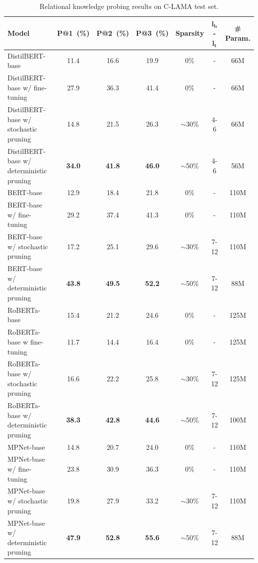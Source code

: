 \begin{table}[t!]
	\centering
	\scriptsize
	\begin{tabular}{l|ccc|c|c|c}
		\toprule
		\textbf{Model} & \textbf{P@1~(\%)} & \textbf{P@2~(\%)} & \textbf{P@3~(\%)} & \textbf{Sparsity}  & $\bm{l_b}$-$\bm{l_t}$ & \textbf{\# Param.}\\
		\midrule
		DistilBERT-base & 11.4 &16.6  &19.9  & 0\% & - & 66M\\
		DistilBERT-base w/ fine-tuning &27.9  &36.3  &41.4  & 0\% & - & 66M\\
		DistilBERT-base w/ stochastic pruning & 14.8 &21.5 &26.3 & $\sim$30\% & 4-6 &66M \\
		DistilBERT-base w/ deterministic pruning & \textbf{34.0} &\textbf{41.8} &\textbf{46.0} & $\sim$50\% & 4-6 &56M \\
		\midrule
		BERT-base & 12.9 & 18.4  & 21.8 & 0\% & -  &110M\\
		BERT-base w/ fine-tuning &29.2  &37.4   &41.3  & 0\% & -  &110M\\
		BERT-base w/ stochastic pruning & 17.2 & 25.1  & 29.6  & $\sim$30\% & 7-12 & 110M\\
		BERT-base w/ deterministic pruning & \textbf{43.8} & \textbf{49.5}  & \textbf{52.2}  & $\sim$50\% & 7-12 & 88M\\
		\midrule
		RoBERTa-base & 15.4 & 21.2  & 24.6 & 0\% & - &125M  \\
		RoBERTa-base w fine-tuning &11.7  &14.4  &16.4 & 0\% & - &125M  \\
		RoBERTa-base w/ stochastic pruning &16.6  &22.2   &25.8   & $\sim$30\% & 7-12 & 125M\\
		RoBERTa-base w/ deterministic pruning &\textbf{38.3}  &\textbf{42.8}   &\textbf{44.6}   & $\sim$50\% & 7-12 &100M \\
		\midrule
		MPNet-base& 14.8  &20.7   &24.0 & 0\%  & - & 110M\\
		MPNet-base w/ fine-tuning &23.8   &30.9   &36.3 & 0\%  & - & 110M\\
		MPNet-base w/ stochastic pruning &19.8  &27.9   &33.2  & $\sim$30\% & 7-12  & 110M\\
		MPNet-base w/ deterministic pruning & \textbf{47.9} &\textbf{52.8}   &\textbf{55.6}  & $\sim$50\% & 7-12 &88M \\
		\bottomrule
	\end{tabular}
	\caption{Relational knowledge probing results on C-LAMA test set.}
	\label{table:rank}
\end{table}


